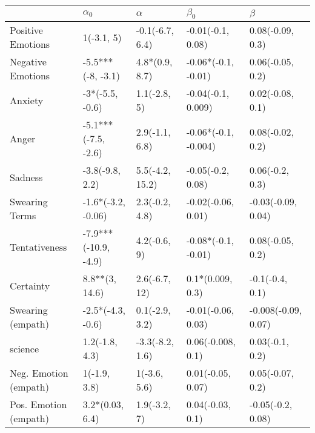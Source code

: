 \begin{tabular}{lllll}
\toprule
{} &            $\alpha_0$ &         $\alpha$ &             $\beta_0$ &              $\beta$ \\
\midrule
Positive Emotions     &            1(-3.1, 5) &  -0.1(-6.7, 6.4) &     -0.01(-0.1, 0.08) &     0.08(-0.09, 0.3) \\
Negative Emotions     &     -5.5***(-8, -3.1) &   4.8*(0.9, 8.7) &   -0.06*(-0.1, -0.01) &     0.06(-0.05, 0.2) \\
Anxiety               &       -3*(-5.5, -0.6) &     1.1(-2.8, 5) &    -0.04(-0.1, 0.009) &     0.02(-0.08, 0.1) \\
Anger                 &   -5.1***(-7.5, -2.6) &   2.9(-1.1, 6.8) &  -0.06*(-0.1, -0.004) &     0.08(-0.02, 0.2) \\
Sadness               &       -3.8(-9.8, 2.2) &  5.5(-4.2, 15.2) &     -0.05(-0.2, 0.08) &      0.06(-0.2, 0.3) \\
Swearing Terms        &    -1.6*(-3.2, -0.06) &   2.3(-0.2, 4.8) &    -0.02(-0.06, 0.01) &   -0.03(-0.09, 0.04) \\
Tentativeness         &  -7.9***(-10.9, -4.9) &     4.2(-0.6, 9) &   -0.08*(-0.1, -0.01) &     0.08(-0.05, 0.2) \\
Certainty             &        8.8**(3, 14.6) &    2.6(-6.7, 12) &      0.1*(0.009, 0.3) &      -0.1(-0.4, 0.1) \\
Swearing (empath)     &     -2.5*(-4.3, -0.6) &   0.1(-2.9, 3.2) &    -0.01(-0.06, 0.03) &  -0.008(-0.09, 0.07) \\
science               &        1.2(-1.8, 4.3) &  -3.3(-8.2, 1.6) &     0.06(-0.008, 0.1) &      0.03(-0.1, 0.2) \\
Neg. Emotion (empath) &          1(-1.9, 3.8) &     1(-3.6, 5.6) &     0.01(-0.05, 0.07) &     0.05(-0.07, 0.2) \\
Pos. Emotion (empath) &       3.2*(0.03, 6.4) &     1.9(-3.2, 7) &      0.04(-0.03, 0.1) &    -0.05(-0.2, 0.08) \\
\bottomrule
\end{tabular}
